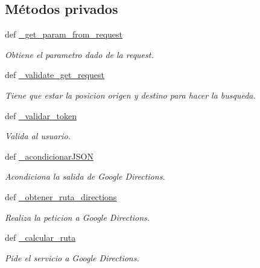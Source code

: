 \subsection*{Métodos privados}
\begin{DoxyCompactItemize}
\item 
def \hyperlink{classsrc_1_1resources_1_1ruta_entre_puntos_1_1_ruta_entre_puntos_a3390399571b1b0c39b29ef87160a0d12}{\-\_\-get\-\_\-param\-\_\-from\-\_\-request}
\begin{DoxyCompactList}\small\item\em Obtiene el parametro dado de la request. \end{DoxyCompactList}\item 
def \hyperlink{classsrc_1_1resources_1_1ruta_entre_puntos_1_1_ruta_entre_puntos_acccf38dbf6137894b72252c46945de9a}{\-\_\-validate\-\_\-get\-\_\-request}
\begin{DoxyCompactList}\small\item\em Tiene que estar la posicion origen y destino para hacer la busqueda. \end{DoxyCompactList}\item 
def \hyperlink{classsrc_1_1resources_1_1ruta_entre_puntos_1_1_ruta_entre_puntos_a9d20c3e5ef51bbcd883ccff859ecdbaa}{\-\_\-validar\-\_\-token}
\begin{DoxyCompactList}\small\item\em Valida al usuario. \end{DoxyCompactList}\item 
def \hyperlink{classsrc_1_1resources_1_1ruta_entre_puntos_1_1_ruta_entre_puntos_a50b49e766dae726c68021b1e2be2e27a}{\-\_\-acondicionar\-J\-S\-O\-N}
\begin{DoxyCompactList}\small\item\em Acondiciona la salida de Google Directions. \end{DoxyCompactList}\item 
def \hyperlink{classsrc_1_1resources_1_1ruta_entre_puntos_1_1_ruta_entre_puntos_afb5b3a1568a0c6692adf4cbea7f5fcd8}{\-\_\-obtener\-\_\-ruta\-\_\-directions}
\begin{DoxyCompactList}\small\item\em Realiza la peticion a Google Directions. \end{DoxyCompactList}\item 
def \hyperlink{classsrc_1_1resources_1_1ruta_entre_puntos_1_1_ruta_entre_puntos_af12eba89beaa4a98c5c4ab711cf10021}{\-\_\-calcular\-\_\-ruta}
\begin{DoxyCompactList}\small\item\em Pide el servicio a Google Directions. \end{DoxyCompactList}\end{DoxyCompactItemize}


